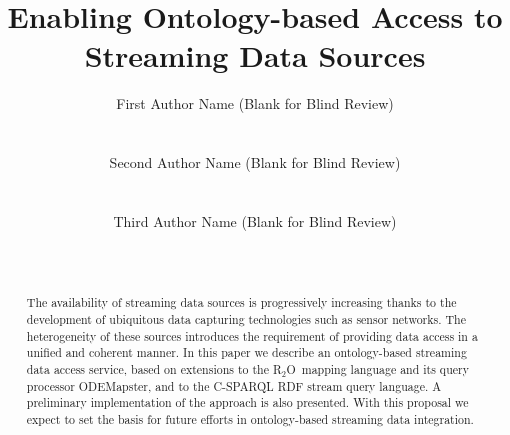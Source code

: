\documentclass{ubicomp2010}
\newcommand{\subscript}[1]{\ensuremath{_{\textrm{#1}}}}
\newcommand{\rtwoo}{\textsf{R\subscript{2}O}}
\begin{document}
\setlength{\paperheight}{11in}
\setlength{\paperwidth}{8.5in}
\setlength{\pdfpageheight}{\paperheight}
\setlength{\pdfpagewidth}{\paperwidth}




\title{Enabling Ontology-based Access to Streaming Data Sources}
\author{
  \alignauthor First Author Name (Blank for Blind Review)\\
    \\
    \\
 \alignauthor Second Author Name (Blank for Blind Review)\\
    \\
    \\
 \alignauthor Third Author Name (Blank for Blind Review)\\
    \\
    \\
      }
\maketitle

\begin{abstract}
The availability of streaming data sources is progressively increasing thanks to the development of ubiquitous data capturing technologies such as sensor networks. The heterogeneity of these sources introduces the requirement of providing data access in a unified and coherent manner. In this paper we describe an ontology-based streaming data access service, based on extensions to the \rtwoo\ mapping language and its query processor ODEMapster, and to the C-SPARQL RDF stream query language. A preliminary implementation of the approach is also presented. With this proposal we expect to set the basis for future efforts in ontology-based streaming data integration.
\end{abstract}
\end{document}
